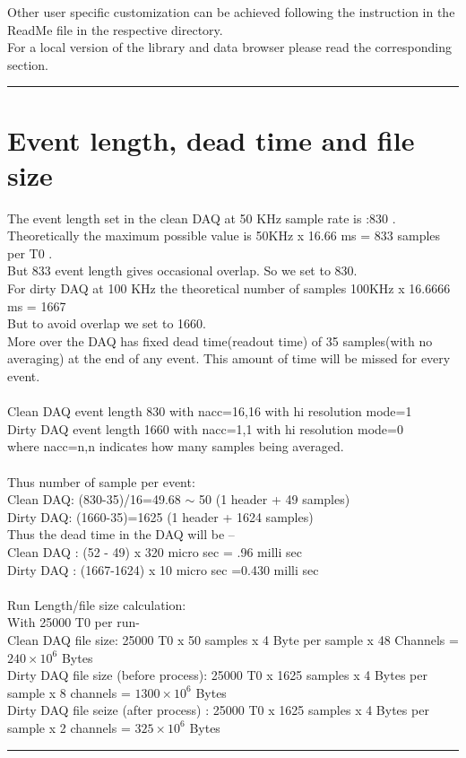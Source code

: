 \documentclass[12pt]{article}
\begin{document}
Other user specific customization can be achieved following the instruction in the ReadMe file in the respective directory.\\
For a local version of the library and data browser please read the corresponding section.

\noindent
{\color{red} \rule{\linewidth}{1mm} }
 
\newpage
\section{Event length, dead time and file size}
The  event length set in the clean DAQ at 50 KHz sample rate is :830 . Theoretically the maximum possible value is 50KHz x 16.66 ms = 833 samples per T0 . \\
But 833 event length gives occasional overlap. So we set to 830. \\
For dirty DAQ at 100 KHz the theoretical number of samples 100KHz x 16.6666 ms = 1667 \\
But to avoid overlap we set to 1660. \\
More over the DAQ has fixed dead time(readout time) of 35 samples(with no averaging) at the end of any event. This amount of time will be missed for every event.\\
\\
Clean DAQ event length 830 with nacc=16,16 with hi resolution mode=1\\
Dirty DAQ event length 1660 with nacc=1,1 with hi resolution mode=0\\
where nacc=n,n indicates how many samples being averaged.\\
\\
Thus number of sample per event:\\
Clean DAQ: (830-35)/16=49.68 $\sim$ 50  (1 header + 49 samples)\\
Dirty DAQ: (1660-35)=1625 (1 header + 1624 samples) \\
Thus the dead time in the DAQ will be --\\
Clean DAQ : (52 - 49) x 320 micro sec = .96 milli sec\\
Dirty DAQ : (1667-1624) x 10 micro sec =0.430 milli sec\\\\
Run Length/file size calculation:\\
With 25000 T0 per run- \\
Clean DAQ file size: 25000 T0 x 50 samples x 4 Byte per sample x 48 Channels =$240 \times 10^6$ Bytes\\
Dirty DAQ file size (before process): 25000 T0 x 1625 samples x 4 Bytes per sample x 8 channels = $1300 \times 10^6$ Bytes\\
Dirty DAQ file seize (after process) : 25000 T0 x 1625 samples x 4 Bytes per sample x 2 channels = $325 \times 10^6$ Bytes\\
\noindent
{\color{red} \rule{\linewidth}{1mm} }
 
\end{document}
